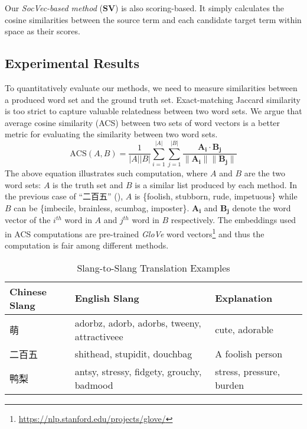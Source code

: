 Our {\em SocVec-based method} (\textbf{SV}) is also scoring-based. It simply calculates the cosine similarities between the source term and each candidate target term within \textit{\socvec} space as their scores.

\subsection{Experimental Results}
\label{sec:exp}

To quantitatively evaluate our methods, we need to measure similarities between 
a produced word set and the ground truth set. 
Exact-matching Jaccard similarity is too strict to capture 
valuable relatedness between two word sets.
We argue that average cosine similarity (ACS) between two sets of word 
vectors is a better metric for evaluating the similarity between two word sets.
\begin{equation*}
	\text{ACS} (A,B)=
	{\frac{1}{|A||B|}}{\sum_{i=1}^{|A|}{\sum_{j=1}^{|B|}} \frac{\mathbf{A_i }\cdot \mathbf{B_j}}{\|\mathbf{A_i }\|\|\mathbf{B_j }\|}}
\end{equation*}
The above equation illustrates such computation, where $A$ and $B$ are the two word sets:
{$A$ is the truth set and $B$ is a similar list produced by each method. In the previous case of ``二百五'' (), $A$ is \{foolish, stubborn, rude, impetuous\} while $B$ can be \{imbecile, brainless, scumbag, imposter\}.}
$\mathbf{A_i}$ and $\mathbf{B_j}$ denote the word vector of the $i^{th}$ word in $A$ and $j^{th}$ word in $B$ respectively. 
The embeddings used in ACS computations are pre-trained \textit{GloVe} 
word vectors\footnote{\scriptsize \url{https://nlp.stanford.edu/projects/glove/}} and thus the computation is fair among different methods.
\begin{table}[t]
	\small
	\centering
	\caption{{Slang-to-Slang Translation Examples}}
	\begin{tabular}{C{1.92cm} C{2.5cm} C{2.0cm}}
		\textbf{Chinese Slang} & \textbf{English Slang} & \textbf{Explanation} \\ \hline
		萌 & adorbz, adorb, adorbs, tweeny, attractiveee & cute, adorable \\ \hline
		二百五 & shithead, stupidit, douchbag & A foolish person\\ \hline
		鸭梨 & antsy, stressy, fidgety, grouchy, badmood & stress, pressure, burden \\ \hline
	\end{tabular}
	\label{tab:bleis_4}
\end{table}

